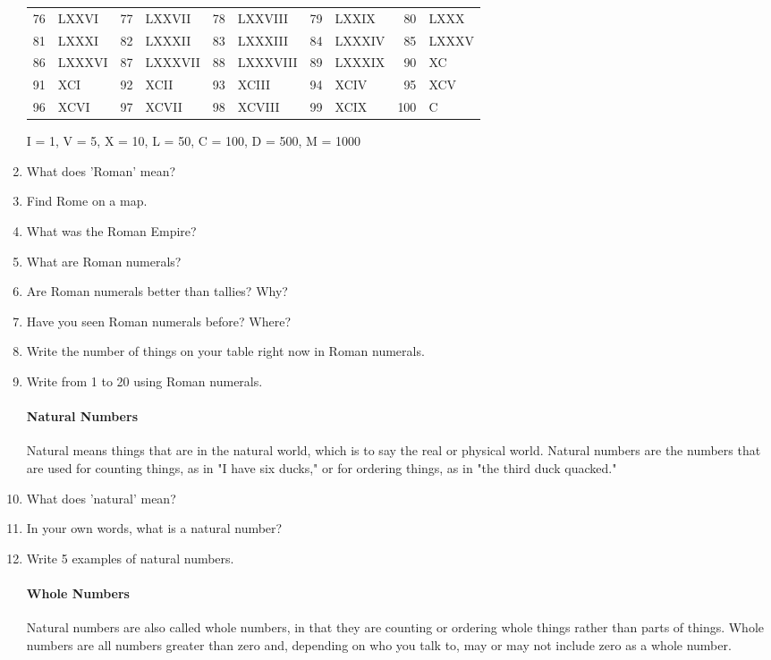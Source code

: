 \documentclass[12pt]{article}
\begin{document}
\begin{enumerate}
\begin{center}
\begin{table}[ht]
\begin{tabular}{rlrlrlrlrl}
76 & LXXVI  & 77 & LXXVII  & 78 & LXXVIII  & 79 & LXXIX  & 80 & LXXX \\
81 & LXXXI  & 82 & LXXXII  & 83 & LXXXIII  & 84 & LXXXIV & 85 & LXXXV\\
86 & LXXXVI & 87 & LXXXVII & 88 & LXXXVIII & 89 & LXXXIX & 90 & XC   \\
91 & XCI    & 92 & XCII    & 93 & XCIII    & 94 & XCIV   & 95 & XCV  \\
96 & XCVI   & 97 & XCVII   & 98 & XCVIII   & 99 & XCIX   & 100& C    \\
\end{tabular}
\end{table}
I = 1, V = 5, X = 10, L = 50, C = 100, D = 500, M = 1000\\
\end{center}

\item What does 'Roman' mean?
\item Find Rome on a map.
\item What was the Roman Empire?
\item What are Roman numerals?
\item Are Roman numerals better than tallies? Why?
\item Have you seen Roman numerals before? Where?
\item Write the number of things on your table right now in Roman numerals.
\item Write from 1 to 20 using Roman numerals.

\paragraph{Natural Numbers}
Natural means things that are in the natural world, which is to say the real or physical world. Natural numbers are the numbers that are used for counting things, as in "I have six ducks," or for ordering things, as in "the third duck quacked."

\item What does 'natural' mean?
\item In your own words, what is a natural number?
\item Write 5 examples of natural numbers.

\paragraph{Whole Numbers}
Natural numbers are also called whole numbers, in that they are counting or ordering whole things rather than parts of things. Whole numbers are all numbers greater than zero and, depending on who you talk to, may or may not include zero as a whole number.


\end{enumerate}
\end{document}
